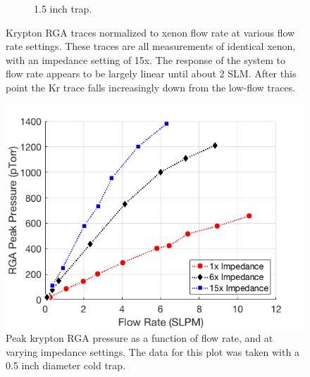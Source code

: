 \documentclass[12pt]{article}
\begin{document}
\begin{figure}[h!]
\begin{subfigure}{0.5\textwidth}
  \caption{1.5 inch trap.}
  \label{fig:flow_traces_1p5}
\end{subfigure}
\caption{Krypton RGA traces normalized to xenon flow rate at various flow rate settings. These traces are all measurements of identical xenon, with an impedance setting of 15x. The response of the system to flow rate appears to be largely linear until about 2 SLM. After this point the Kr trace falls increasingly down from the low-flow traces.} 
\label{fig:flow_traces}
\end{figure}
\begin{figure}[h]
  \includegraphics[width=\linewidth]{Figures/FlowResponse.png}
  \caption{Peak krypton RGA pressure as a function of flow rate, and at varying impedance settings. The data for this plot was taken with a 0.5 inch diameter cold trap.}
  \label{fig:RGAtrace_ideal}
\end{figure}
\end{document}
